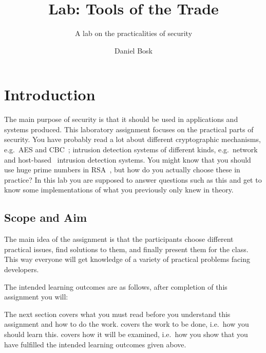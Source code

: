 \title{Lab: Tools of the Trade}
\subtitle{A lab on the practicalities of security}

\author{%
  Daniel Bosk
}

\maketitle

\section{Introduction}
\label{sec:intro}
The main purpose of security is that it should be used in applications and 
systems produced.
This laboratory assignment focuses on the practical parts of security.
You have probably read a lot about different cryptographic mechanisms, e.g.~AES 
\cite{aes} and CBC~\cite{blockmodes}; intrusion detection systems of different 
kinds, e.g.\ network~\cite{snort} and host-based~\cite{ossec} intrusion 
detection systems.
You might know that you should use huge prime numbers in RSA~\cite{rsa}, but 
how do you actually choose these in practice?
In this lab you are supposed to answer questions such as this and get to know 
some implementations of what you previously only knew in theory.

\subsection{Scope and Aim}
\label{sec:aim}
The main idea of the assignment is that the participants choose different 
practical issues, find solutions to them, and finally present them for the 
class.
This way everyone will get knowledge of a variety of practical problems facing 
developers.

The intended learning outcomes are as follows, after completion of this 
assignment you will:
\begin{itemize}
    
\end{itemize}

The next section covers what you must read before you understand this 
assignment and how to do the work.
 covers the work to be done, i.e.~how you should learn this.
 covers how it will be examined, i.e.~how you show that you have 
fulfilled the intended learning outcomes given above.


